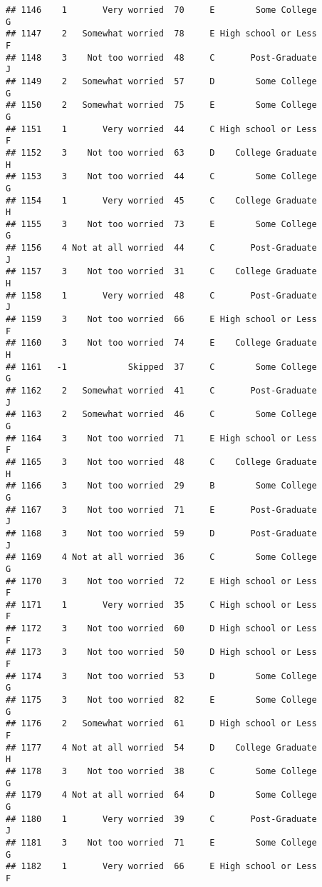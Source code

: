 \documentclass[
]{article}
\begin{document}
\begin{verbatim}
## 1146    1       Very worried  70     E        Some College         G
## 1147    2   Somewhat worried  78     E High school or Less         F
## 1148    3    Not too worried  48     C       Post-Graduate         J
## 1149    2   Somewhat worried  57     D        Some College         G
## 1150    2   Somewhat worried  75     E        Some College         G
## 1151    1       Very worried  44     C High school or Less         F
## 1152    3    Not too worried  63     D    College Graduate         H
## 1153    3    Not too worried  44     C        Some College         G
## 1154    1       Very worried  45     C    College Graduate         H
## 1155    3    Not too worried  73     E        Some College         G
## 1156    4 Not at all worried  44     C       Post-Graduate         J
## 1157    3    Not too worried  31     C    College Graduate         H
## 1158    1       Very worried  48     C       Post-Graduate         J
## 1159    3    Not too worried  66     E High school or Less         F
## 1160    3    Not too worried  74     E    College Graduate         H
## 1161   -1            Skipped  37     C        Some College         G
## 1162    2   Somewhat worried  41     C       Post-Graduate         J
## 1163    2   Somewhat worried  46     C        Some College         G
## 1164    3    Not too worried  71     E High school or Less         F
## 1165    3    Not too worried  48     C    College Graduate         H
## 1166    3    Not too worried  29     B        Some College         G
## 1167    3    Not too worried  71     E       Post-Graduate         J
## 1168    3    Not too worried  59     D       Post-Graduate         J
## 1169    4 Not at all worried  36     C        Some College         G
## 1170    3    Not too worried  72     E High school or Less         F
## 1171    1       Very worried  35     C High school or Less         F
## 1172    3    Not too worried  60     D High school or Less         F
## 1173    3    Not too worried  50     D High school or Less         F
## 1174    3    Not too worried  53     D        Some College         G
## 1175    3    Not too worried  82     E        Some College         G
## 1176    2   Somewhat worried  61     D High school or Less         F
## 1177    4 Not at all worried  54     D    College Graduate         H
## 1178    3    Not too worried  38     C        Some College         G
## 1179    4 Not at all worried  64     D        Some College         G
## 1180    1       Very worried  39     C       Post-Graduate         J
## 1181    3    Not too worried  71     E        Some College         G
## 1182    1       Very worried  66     E High school or Less         F

\end{verbatim}
\end{document}

